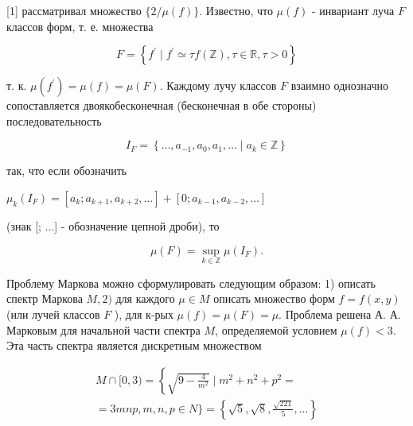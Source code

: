 \documentclass[10pt]{article}
\begin{document}
[1] рассматривал множество $\{2 / \mu(f)\}$. Известно, что $\mu(f)$ - инвариант луча $F$ классов форм, т. е. множества



\[

F=\left\{f^{\prime} \mid f^{\prime} \simeq \tau f(\mathbb{Z}), \tau \in \mathbb{R}, \tau>0\right\}

\]



т. к. $\mu\left(f^{\prime}\right)=\mu(f)=\mu(F)$. Каждому лучу классов $F$ взаимно однозначно сопоставляется двоякобесконечная (бесконечная в обе стороны) последовательность



\[

I_{F}=\left\{\ldots, a_{-1}, a_{0}, a_{1}, \ldots \mid a_{k} \in \mathbb{Z}\right\}

\]



так, что если обозначить



$\mu_{k}\left(I_{F}\right)=\left[a_{k} ; a_{k+1}, a_{k+2}, \ldots\right]+\left[0 ; a_{k-1}, a_{k-2}, \ldots\right]$



(знак $[$; ...] - обозначение цепной дроби), то



\[

\mu(F)=\sup _{k \in \mathbb{Z}} \mu\left(I_{F}\right) .

\]



Проблему Маркова можно сформулировать следующим образом: 1) описать спектр Маркова $M, 2)$ для каждого $\mu \in M$ описать множество форм $f=f(x, y)$ (или лучей классов $F$ ), для к-рых $\mu(f)=\mu(F)=\mu$. Проблема решена А. А. Марковым для начальной части спектра $M$, определяемой условием $\mu(f)<3$. Эта часть спектра является дискретным множеством



\[

\begin{gathered}

M \cap[0,3)=\left\{\sqrt{9-\frac{4}{m^{2}}} \mid m^{2}+n^{2}+p^{2}=\right. \\

=3 m n p, m, n, p \in N\}=\left\{\sqrt{5}, \sqrt{8}, \frac{\sqrt{221}}{5}, \ldots\right\}

\end{gathered}

\]
\end{document}
